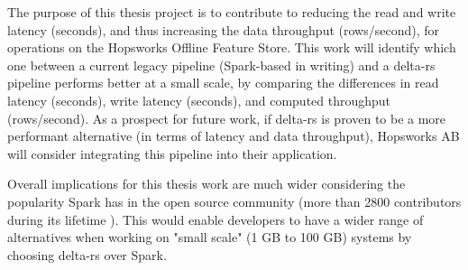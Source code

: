 The purpose of this thesis project is to contribute to reducing the read and write latency (seconds), and thus increasing the data throughput (rows/second), for operations on the Hopsworks Offline Feature Store. This work will identify which one between a current legacy pipeline (Spark-based in writing) and a delta-rs pipeline performs better at a small scale, by comparing the differences in read latency (seconds), write latency (seconds), and computed throughput (rows/second). As a prospect for future work, if delta-rs is proven to be a more performant alternative (in terms of latency and data throughput), Hopsworks \gls{AB} will consider integrating this pipeline into their application.

Overall implications for this thesis work are much wider considering the popularity Spark has in the open source community (more than 2800 contributors during its lifetime \cite{ApacheSparkOpen}). This would enable developers to have a wider range of alternatives when working on "small scale" (1 GB to 100 GB) systems by choosing delta-rs over Spark.